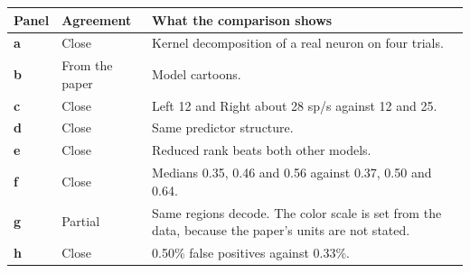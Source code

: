 \begin{longtable}{@{}p{1.1cm}p{2.5cm}p{11.8cm}@{}}
\toprule
Panel & Agreement & What the comparison shows \\
\midrule
\endhead
\textbf{a} & Close & Kernel decomposition of a real neuron on four trials. \\
\textbf{b} & From the paper & Model cartoons. \\
\textbf{c} & Close & Left 12 and Right about 28 sp/s against 12 and 25. \\
\textbf{d} & Close & Same predictor structure. \\
\textbf{e} & Close & Reduced rank beats both other models. \\
\textbf{f} & Close & Medians 0.35, 0.46 and 0.56 against 0.37, 0.50 and 0.64. \\
\textbf{g} & Partial & Same regions decode. The color scale is set from the data, because the paper's units are not stated. \\
\textbf{h} & Close & 0.50\% false positives against 0.33\%. \\
\bottomrule
\end{longtable}
